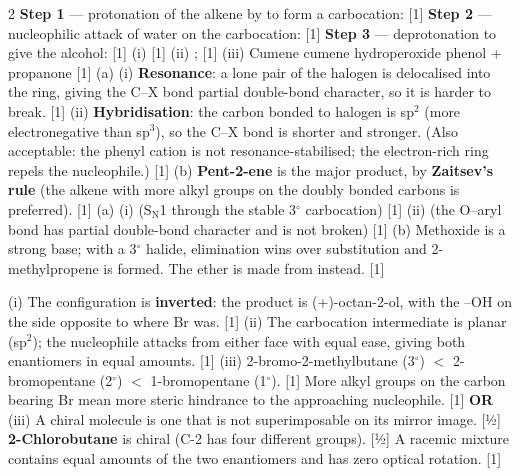 \documentclass[10pt,a4paper]{extarticle}
\newcommand{\mk}[1]{{\scriptsize\color{black!55}[#1]}}
\begin{document}
\begin{multicols}{2}
\An \textbf{Step 1} — protonation of the alkene by  to form a carbocation:\nl
{} \mk{1}\nl
\textbf{Step 2} — nucleophilic attack of water on the carbocation:\nl
{} \mk{1}\nl
\textbf{Step 3} — deprotonation to give the alcohol:\nl
{} \mk{1}
\An (i)  \mk{1}\nl
(ii) ;\;  \mk{1}\nl
(iii) Cumene \ce{->[O2]} cumene hydroperoxide \ce{->[H+][H2O]} phenol + propanone \mk{1}
\An (a) (i) \textbf{Resonance}: a lone pair of the halogen is delocalised into the ring, giving the C--X bond partial double-bond character, so it is harder to break. \mk{1}\nl
(ii) \textbf{Hybridisation}: the carbon bonded to halogen is sp$^2$ (more electronegative than sp$^3$), so the C--X bond is shorter and stronger. (Also acceptable: the phenyl cation is not resonance-stabilised; the electron-rich ring repels the nucleophile.) \mk{1}\nl
(b) \textbf{Pent-2-ene} is the major product, by \textbf{Zaitsev's rule} (the alkene with more alkyl groups on the doubly bonded carbons is preferred). \mk{1}
\An (a) (i)  (S$_\text{N}$1 through the stable 3$^\circ$ carbocation) \mk{1}\nl
(ii)  (the O--aryl bond has partial double-bond character and is not broken) \mk{1}\nl
(b) Methoxide is a strong base; with a 3$^\circ$ halide, elimination wins over substitution and 2-methylpropene is formed. The ether is made from  instead. \mk{1}

\An (i) The configuration is \textbf{inverted}: the product is (+)-octan-2-ol, with the --OH on the side opposite to where Br was. \mk{1}\nl
(ii) The carbocation intermediate is planar (sp$^2$); the nucleophile attacks from either face with equal ease, giving both enantiomers in equal amounts. \mk{1}\nl
(iii) 2-bromo-2-methylbutane (3$^\circ$) $<$ 2-bromopentane (2$^\circ$) $<$ 1-bromopentane (1$^\circ$). \mk{1} More alkyl groups on the carbon bearing Br mean more steric hindrance to the approaching nucleophile. \mk{1}\nl
\textbf{OR} (iii) A chiral molecule is one that is not superimposable on its mirror image. \mk{½} \textbf{2-Chlorobutane} is chiral (C-2 has four different groups). \mk{½} A racemic mixture contains equal amounts of the two enantiomers and has zero optical rotation. \mk{1}


\end{multicols}
\end{document}
